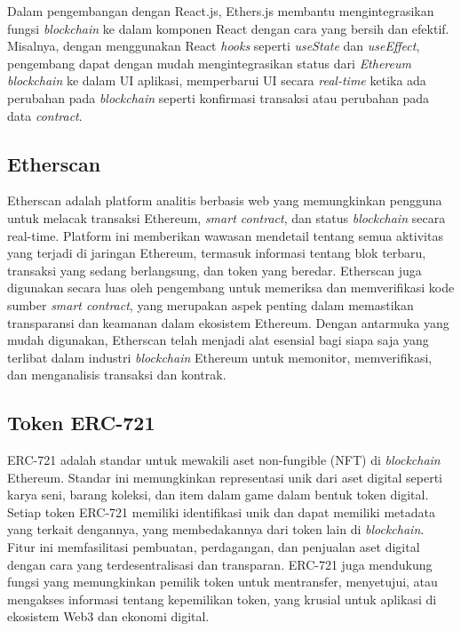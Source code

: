 Dalam pengembangan dengan React.js, Ethers.js membantu mengintegrasikan fungsi \emph{blockchain} ke dalam komponen React dengan cara yang bersih dan efektif. Misalnya, dengan menggunakan React \emph{hooks} seperti \emph{useState} dan \emph{useEffect}, pengembang dapat dengan mudah mengintegrasikan status dari \emph{Ethereum blockchain} ke dalam UI aplikasi, memperbarui UI secara \emph{real-time} ketika ada perubahan pada \emph{blockchain} seperti konfirmasi transaksi atau perubahan pada data \emph{contract}.

\subsection{Etherscan}
Etherscan adalah platform analitis berbasis web yang memungkinkan pengguna untuk melacak transaksi Ethereum, \emph{smart contract}, dan status \emph{blockchain} secara real-time. Platform ini memberikan wawasan mendetail tentang semua aktivitas yang terjadi di jaringan Ethereum, termasuk informasi tentang blok terbaru, transaksi yang sedang berlangsung, dan token yang beredar. Etherscan juga digunakan secara luas oleh pengembang untuk memeriksa dan memverifikasi kode sumber \emph{smart contract}, yang merupakan aspek penting dalam memastikan transparansi dan keamanan dalam ekosistem Ethereum. Dengan antarmuka yang mudah digunakan, Etherscan telah menjadi alat esensial bagi siapa saja yang terlibat dalam industri \emph{blockchain} Ethereum untuk memonitor, memverifikasi, dan menganalisis transaksi dan kontrak.

\subsection{Token ERC-721}
ERC-721 adalah standar untuk mewakili aset non-fungible (NFT) di \emph{blockchain} Ethereum. Standar ini memungkinkan representasi unik dari aset digital seperti karya seni, barang koleksi, dan item dalam game dalam bentuk token digital. Setiap token ERC-721 memiliki identifikasi unik dan dapat memiliki metadata yang terkait dengannya, yang membedakannya dari token lain di \emph{blockchain}. Fitur ini memfasilitasi pembuatan, perdagangan, dan penjualan aset digital dengan cara yang terdesentralisasi dan transparan. ERC-721 juga mendukung fungsi yang memungkinkan pemilik token untuk mentransfer, menyetujui, atau mengakses informasi tentang kepemilikan token, yang krusial untuk aplikasi di ekosistem Web3 dan ekonomi digital.